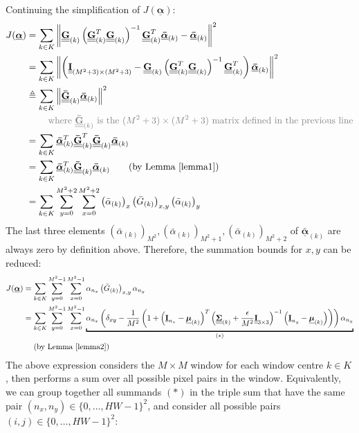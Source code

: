 \documentclass{article}
\theoremstyle{definition}
\newcommand{\textgrey}[1]{\textcolor{gray}{#1}}
\def\vt#1{\underline{\mathbf{#1}}}
\def\vts#1{\underline{\boldsymbol{#1}}}
\def\mt#1{\underline{\underline{\mathbf{#1}}}}
\def\mts#1{\underline{\underline{\boldsymbol{#1}}}}
\begin{document}
Continuing the simplification of $J(\vts\alpha)$:
\begin{align*}
    J(\vts\alpha) &=  \sum_{k\in K} \left\| \mt G_{(k)}\left(\mt G_{(k)}^T \mt G_{(k)} \right)^{-1} \mt G_{(k)}^T \vts{\bar{\alpha}}_{(k)}  - \vts{\bar{\alpha}}_{(k)} \right\|^2\\
    &=  \sum_{k\in K} \left\| \left(\mt I_{(M^2+3)\times(M^2+3)} -  \mt G_{(k)}\left(\mt G_{(k)}^T \mt G_{(k)} \right)^{-1} \mt G_{(k)}^T \right) \vts{\bar{\alpha}}_{(k)}   \right\|^2\\
    &\triangleq  \sum_{k\in K} \left\| \mt{\bar{G}}_{(k)} \vts{\bar{\alpha}}_{(k)}   \right\|^2\\
    &\quad\quad\ \textgrey{\text{where $\mt{\bar{G}}_{(k)}$ is the $(M^2+3)\times(M^2+3)$ matrix defined in the previous line}}\\
    &= \sum_{k\in K} \vts{\bar{\alpha}}_{(k)}^T \mt{\bar{G}}_{(k)}^T \mt{\bar{G}}_{(k)} \vts{\bar{\alpha}}_{(k)}\\
    &= \sum_{k\in K} \vts{\bar{\alpha}}_{(k)}^T  \mt{\bar{G}}_{(k)} \vts{\bar{\alpha}}_{(k)} \qquad\text{(by Lemma \ref{lemma1})}\\
    &= \sum_{k\in K} \sum_{y=0}^{M^2+2} \sum_{x=0}^{M^2+2} \left({\bar{\alpha}}_{(k)}\right)_x  \left({\bar{G}}_{(k)}\right)_{x,y} \left({\bar{\alpha}}_{(k)}\right)_y
\end{align*}
The last three elements $\left({\bar{\alpha}}_{(k)}\right)_{M^2}, \left({\bar{\alpha}}_{(k)}\right)_{M^2+1}, \left({\bar{\alpha}}_{(k)}\right)_{M^2+2}$ of $\vts{\bar{\alpha}}_{(k)}$ are always zero by definition above. Therefore, the summation bounds for $x,y$ can be reduced: %
\begin{align*}
    J(\vts\alpha) &= \sum_{k\in K} \sum_{y=0}^{M^2-1} \sum_{x=0}^{M^2-1} \alpha_{n_x}  \left({\bar{G}}_{(k)}\right)_{x,y} \alpha_{n_y}\\
    &= \sum_{k\in K} \sum_{y=0}^{M^2-1} \sum_{x=0}^{M^2-1} \underbracket{\alpha_{n_x}  \left( \delta_{xy} - \frac1{M^2}\left(1 + \left(\vt{I}_{n_x} - \vts \mu_{(k)}\right)^T \left(\mts \Sigma_{(k)} + \frac\epsilon{M^2} \mt{I}_{3\times 3}\right)^{-1} \left(\vt{I}_{n_y} - \vts \mu_{(k)}\right) \right) \right) \alpha_{n_y}}_{(*)}\\
    &\quad\ \text{(by Lemma \ref{lemma2})}
\end{align*}
The above expression considers the $M\times M$ window for each window centre $k\in K$, then performs a sum over all possible pixel pairs in the window. Equivalently, we can group together all summands $(*)$ in the triple sum that have the same pair $(n_x,n_y)\in\{0,\dots,HW-1\}^2$, and consider all possible pairs $(i,j)\in\{0,\dots,HW-1\}^2$: \label{appendix:theorem-1-project}
\end{document}
